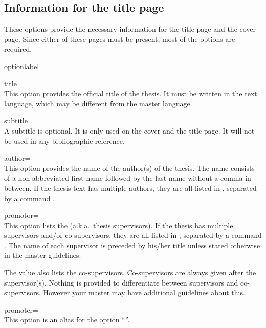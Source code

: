 \subsection{Information for the title page}
These options provide the necessary information for the title page and the
cover page. Since either of these pages must be present, most of the
options are required.

\begin{labelled}{optionlabel}
\item[title=\meta{title}]\\
  This option provides the official title  of the thesis. It
  must be written in the text language, which may be different from the
  master language.

\item[subtitle=\meta{stitle}]\\
  A subtitle  is optional. It is only used on the cover and
  the title page. It will not be used in any bibliographic reference.

\item[author=\meta{authors}]
  \label{opt:author}\\
  This option provides the name  of the author(s) of the
  thesis. The name consists of a non-abbreviated first name followed by the
  last name without a comma in between. If the thesis text has multiple
  authors, they are all listed in , separated by a command
  .

\item[promotor=\meta{promoters}]
  \\
  This option lists the  (a.k.a.\ thesis supervisors). If
  the thesis has multiple supervisors and/or co-supervisors, they are all
  listed in , separated by a command . The name of
  each supervisor is preceded by his/her title unless stated otherwise in
  the master guidelines.

  The  value also lists the co-supervisors. Co-supervisors are
  always given after the supervisor(s). Nothing is provided to differentiate
  between supervisors and co-supervisors. However your master may have
  additional guidelines about this.

\item[promoter=\meta{promoters}]
  \\
  This option is an alias for the option ``''.


\end{labelled}
